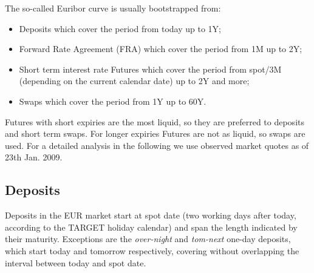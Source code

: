 \documentclass[11pt,reqno]{amsart}
\begin{document}
The so-called Euribor curve is usually bootstrapped from:
\begin{itemize}
\item Deposits which cover the period from today up to 1Y;
\item Forward Rate Agreement (FRA) which cover the period from 1M up to 2Y;
\item Short term interest rate Futures which cover the period from spot/3M (depending on the current calendar date) up to 2Y and more;
\item Swaps which cover the period from 1Y up to 60Y.
\end{itemize}

Futures with short expiries are the most liquid, so they are preferred to
deposits and short term swaps. For longer expiries Futures are not as liquid, so
swaps are used. For a detailed analysis in the following we use observed market quotes as of
23th Jan. 2009.

\subsection{\label{SecDepo}Deposits}
Deposits in the EUR market start at spot date (two working days after today, according to the TARGET holiday calendar) and span the length indicated by their maturity. Exceptions are the {\it over-night} and {\it tom-next} one-day deposits, which start today and tomorrow respectively, covering without overlapping the interval between today and spot date.
\end{document}
